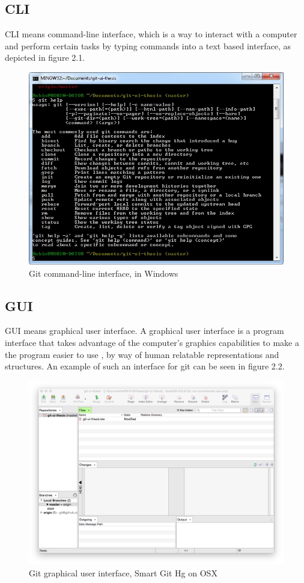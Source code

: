 \documentclass[a4paper,oneside]{bth} %
\begin{document}
			\subsection{CLI}
			CLI means command-line interface, which is a way to interact with a computer and perform certain tasks by typing commands into a text based interface, as depicted in figure 2.1.
			\begin{figure}[p]
				\centering
				\includegraphics[width=0.8\linewidth]{git-cli.jpg}
				\caption{Git command-line interface, in Windows}
				\label{fig:git-cli}
			\end{figure}
			
			\subsection{GUI}
			GUI means graphical user interface. A graphical user interface is a program interface that takes advantage of the computer's graphics capabilities to make a the program easier to use \cite{WhatIsGui}, by way of human relatable representations and structures. An example of such an interface for git can be seen in figure 2.2.
			\begin{figure}[p]
				\centering
				\includegraphics[width=0.8\linewidth]{git-gui.png}
				\caption{Git graphical user interface, Smart Git Hg on OSX}
				\label{fig:git-gui}
			\end{figure}
			
\end{document}
